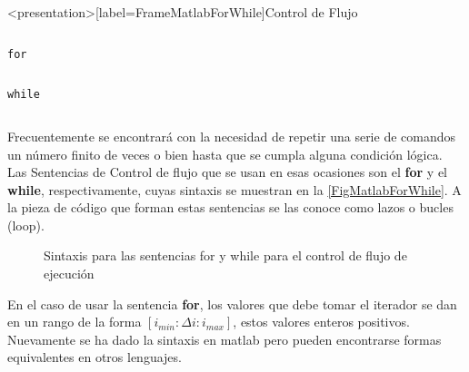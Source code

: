 \begin{frame}<presentation>[label=FrameMatlabForWhile]{Control de Flujo}
  \begin{columns}
    \hfill


  \end{columns}

  \begin{columns}[T]
      \flushright \large\texttt{for}

	

	

  \end{columns}

  \begin{columns}[T]
    \flushright \large\texttt{while}

	

	

  \end{columns}
\end{frame}


Frecuentemente se encontrará con la necesidad de repetir una serie de 
comandos un número finito de veces o bien hasta que se cumpla alguna 
condición lógica. Las Sentencias de Control de flujo que se usan en esas 
ocasiones son el \textbf{for} y el \textbf{while}, respectivamente, 
cuyas sintaxis se muestran en la \autoref{FigMatlabForWhile}. A la pieza de
código que forman estas sentencias se las conoce como
lazos o bucles (loop).

\begin{figure}
  \caption{
    Sintaxis para las sentencias for y while
  para el control de flujo de ejecución \label{FigMatlabForWhile}
}
\end{figure}

En el caso de usar la sentencia \textbf{for}, los valores que debe tomar
el iterador se dan en un rango de la forma  $[ i_{min} :  \Delta i : i_{max} ]$, 
estos valores enteros positivos. Nuevamente se ha dado la sintaxis en matlab
pero pueden encontrarse formas equivalentes en otros lenguajes. 

